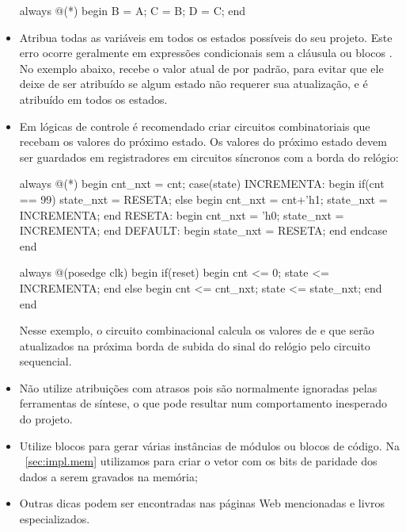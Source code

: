 \begin{itemize}
\begin{verilogcode}
always @(*) begin
    B = A;
    C = B;
    D = C;
end
\end{verilogcode}

\item Atribua todas as variáveis em todos os estados possíveis do
seu projeto. Este erro ocorre geralmente em expressões condicionais
 sem a cláusula  ou blocos . No exemplo
abaixo,  recebe o valor atual de  por padrão,
para evitar que ele deixe de ser atribuído se algum estado não
requerer sua atualização, e  é atribuído em todos os
estados. 

\item Em lógicas de controle é recomendado criar circuitos
combinatoriais que recebam os valores do próximo estado. Os valores
do próximo estado devem ser guardados em registradores em circuitos
síncronos com a borda do relógio:

\begin{verilogcode}
always @(*) begin
    cnt_nxt = cnt;  
    case(state)
        INCREMENTA: begin 
            if(cnt == 99)
                state_nxt = RESETA;
            else begin
                cnt_nxt = cnt+'h1;
                state_nxt = INCREMENTA;
        end    
        RESETA: begin 
            cnt_nxt = 'h0;
            state_nxt = INCREMENTA;
        end
        DEFAULT: begin
            state_nxt = RESETA;
        end
    endcase
end

always @(posedge clk) begin
    if(reset) begin
        cnt <= 0;
        state <= INCREMENTA;
    end
    else begin
        cnt <= cnt_nxt;
        state <= state_nxt;
    end
end
\end{verilogcode}

Nesse exemplo, o circuito combinacional calcula os valores de
 e  que serão atualizados na próxima borda de
subida do sinal do relógio pelo circuito sequencial.

\item Não utilize atribuições com atrasos pois são normalmente
ignoradas pelas ferramentas de síntese, o que pode resultar num
comportamento inesperado do projeto.


\item Utilize blocos  para gerar várias instâncias de
módulos ou blocos de código. Na \secstr~\ref{sec:impl.mem}
utilizamos  para criar o vetor com os bits de paridade
dos dados a serem gravados na memória;

\item Outras dicas podem ser encontradas nas páginas Web mencionadas
e livros especializados.

\end{itemize}


